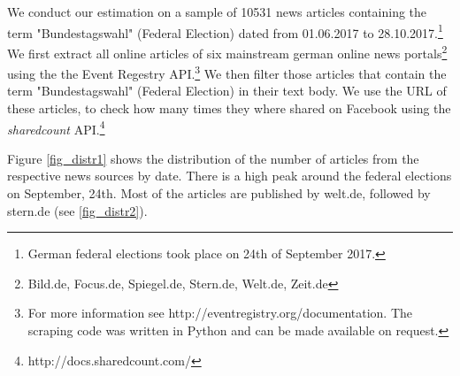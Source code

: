 \documentclass[12pt,a4paper,notitlepage]{article}
\begin{document}
We conduct our estimation on a sample of 10531 news articles containing the term "Bundestagswahl" (Federal Election) dated from 01.06.2017 to 28.10.2017.\footnote{German federal elections took place on 24th of September 2017.} We first extract all online articles of six mainstream german online news portals\footnote{Bild.de, Focus.de, Spiegel.de, Stern.de, Welt.de, Zeit.de} using the the Event Regestry API.\footnote{For more information see http://eventregistry.org/documentation. The scraping code was written in Python and can be made available on request.} We then filter those articles that contain the term "Bundestagswahl" (Federal Election) in their text body. We use the URL of these articles, to check how many times they where shared on Facebook using the \textit{sharedcount} API.\footnote{http://docs.sharedcount.com/}

Figure \ref{fig_distr1} shows the distribution of the number of articles from the respective news sources by date. There is a high peak around the federal elections on September, 24th. Most of the articles are published by welt.de, followed by stern.de (see \ref{fig_distr2}).  
\end{document}
